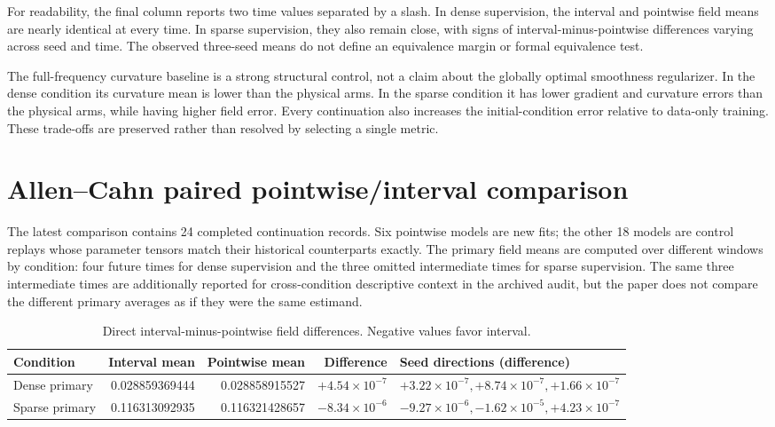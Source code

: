 \documentclass[10pt,a4paper]{article}
\begin{document}
For readability, the final column reports two time values separated by a slash. In dense supervision, the interval and pointwise field means are nearly identical at every time. In sparse supervision, they also remain close, with signs of interval-minus-pointwise differences varying across seed and time. The observed three-seed means do not define an equivalence margin or formal equivalence test.

The full-frequency curvature baseline is a strong structural control, not a claim about the globally optimal smoothness regularizer. In the dense condition its curvature mean is lower than the physical arms. In the sparse condition it has lower gradient and curvature errors than the physical arms, while having higher field error. Every continuation also increases the initial-condition error relative to data-only training. These trade-offs are preserved rather than resolved by selecting a single metric.

\section{Allen--Cahn paired pointwise/interval comparison}
The latest comparison contains 24 completed continuation records. Six pointwise models are new fits; the other 18 models are control replays whose parameter tensors match their historical counterparts exactly. The primary field means are computed over different windows by condition: four future times for dense supervision and the three omitted intermediate times for sparse supervision. The same three intermediate times are additionally reported for cross-condition descriptive context in the archived audit, but the paper does not compare the different primary averages as if they were the same estimand.

\begin{table}[H]
\centering\small
\caption{Direct interval-minus-pointwise field differences. Negative values favor interval.}
\label{tab:interval-pointwise}
\begin{tabular}{lrrrl}
\toprule
Condition & Interval mean & Pointwise mean & Difference & Seed directions (difference) \\
\midrule
Dense primary & 0.028859369444 & 0.028858915527 & $+4.54\times10^{-7}$ & $+3.22\times10^{-7}, +8.74\times10^{-7}, +1.66\times10^{-7}$ \\
Sparse primary & 0.116313092935 & 0.116321428657 & $-8.34\times10^{-6}$ & $-9.27\times10^{-6}, -1.62\times10^{-5}, +4.23\times10^{-7}$ \\
\bottomrule
\end{tabular}
\end{table}
\end{document}
